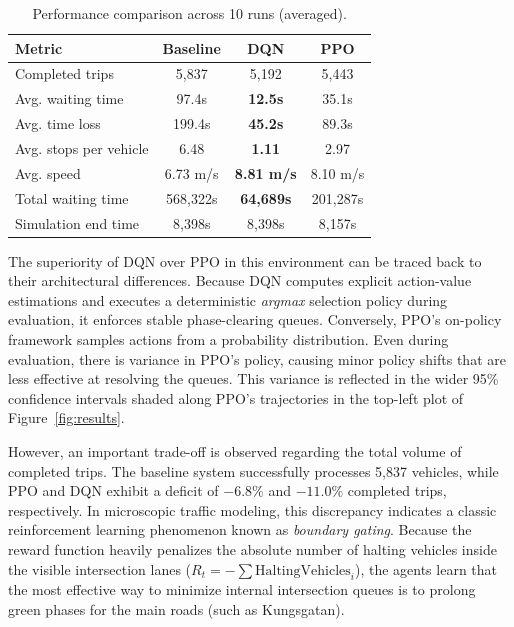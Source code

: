 \documentclass[conference]{IEEEtran}
\begin{document}
\begin{table}[h]
\centering
\caption{Performance comparison across 10 runs (averaged).}
\label{tab:summary}
\begin{tabular}{|l|c|c|c|}
\hline
\textbf{Metric} & \textbf{Baseline} & \textbf{DQN} & \textbf{PPO} \\
\hline
Completed trips        & 5{,}837   & 5{,}192          & 5{,}443  \\
\hline
Avg. waiting time      & 97.4s     & \textbf{12.5s}   & 35.1s    \\
\hline
Avg. time loss         & 199.4s    & \textbf{45.2s}   & 89.3s    \\
\hline
Avg. stops per vehicle & 6.48      & \textbf{1.11}    & 2.97     \\
\hline
Avg. speed             & 6.73 m/s  & \textbf{8.81 m/s}& 8.10 m/s \\
\hline
Total waiting time     & 568{,}322s& \textbf{64{,}689s}& 201{,}287s \\
\hline
Simulation end time    & 8{,}398s  & 8{,}398s         & 8{,}157s \\
\hline
\end{tabular}
\end{table}

The superiority of DQN over PPO in this environment can be traced back to their architectural differences. Because DQN computes explicit action-value estimations and executes a deterministic \textit{argmax} selection policy during evaluation, it enforces stable phase-clearing queues. Conversely, PPO's on-policy framework samples actions from a probability distribution. Even during evaluation, there is variance in PPO's policy, causing minor policy shifts that are less effective at resolving the queues. This variance is reflected in the wider 95\% confidence intervals shaded along PPO's trajectories in the top-left plot of Figure~\ref{fig:results}.

However, an important trade-off is observed regarding the total volume of completed trips. The baseline system successfully processes 5,837 vehicles, while PPO and DQN exhibit a deficit of $-6.8\%$ and $-11.0\%$ completed trips, respectively. In microscopic traffic modeling, this discrepancy indicates a classic reinforcement learning phenomenon known as \textit{boundary gating}. Because the reward function heavily penalizes the absolute number of halting vehicles inside the visible intersection lanes ($R_t = - \sum \text{HaltingVehicles}_i$), the agents learn that the most effective way to minimize internal intersection queues is to prolong green phases for the main roads (such as Kungsgatan).
\end{document}

